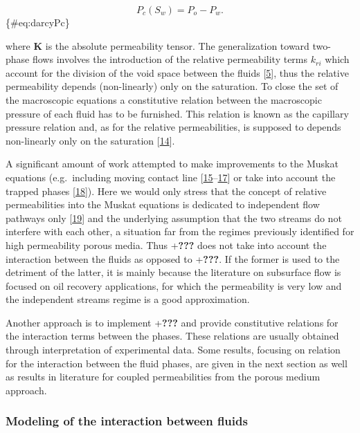 \documentclass[]{article}
\begin{document}
\[
P_{c}(S_{w})=P_{o}-P_{w}.
\] \{\#eq:darcyPc\}

where \(\mathbf{K}\) is the absolute permeability tensor. The
generalization toward two-phase flows involves the introduction of the
relative permeability terms \(k_{ri}\) which account for the division of
the void space between the fluids
{[}\protect\hyperlink{ref-dullien2012porous}{5}{]}, thus the relative
permeability depends (non-linearly) only on the saturation. To close the
set of the macroscopic equations a constitutive relation between the
macroscopic pressure of each fluid has to be furnished. This relation is
known as the capillary pressure relation and, as for the relative
permeabilities, is supposed to depends non-linearly only on the
saturation {[}\protect\hyperlink{ref-leverett1941capillary}{14}{]}.

A significant amount of work attempted to make improvements to the
Muskat equations (e.g.~including moving contact line
{[}\protect\hyperlink{ref-kalaydjian1992dynamic}{15}--\protect\hyperlink{ref-barenblatt2003mathematical}{17}{]}
or take into account the trapped phases
{[}\protect\hyperlink{ref-hilfer1998macroscopic}{18}{]}). Here we would
only stress that the concept of relative permeabilities into the Muskat
equations is dedicated to independent flow pathways only
{[}\protect\hyperlink{ref-blunt2017multiphase}{19}{]} and the underlying
assumption that the two streams do not interfere with each other, a
situation far from the regimes previously identified for high
permeability porous media. Thus +\textbf{???} does not take into account
the interaction between the fluids as opposed to +\textbf{???}. If the
former is used to the detriment of the latter, it is mainly because the
literature on subsurface flow is focused on oil recovery applications,
for which the permeability is very low and the independent streams
regime is a good approximation.

Another approach is to implement +\textbf{???} and provide constitutive
relations for the interaction terms between the phases. These relations
are usually obtained through interpretation of experimental data. Some
results, focusing on relation for the interaction between the fluid
phases, are given in the next section as well as results in literature
for coupled permeabilities from the porous medium approach.

\hypertarget{modeling-of-the-interaction-between-fluids}{%
\subsubsection{Modeling of the interaction between
fluids}\label{modeling-of-the-interaction-between-fluids}}
\end{document}
